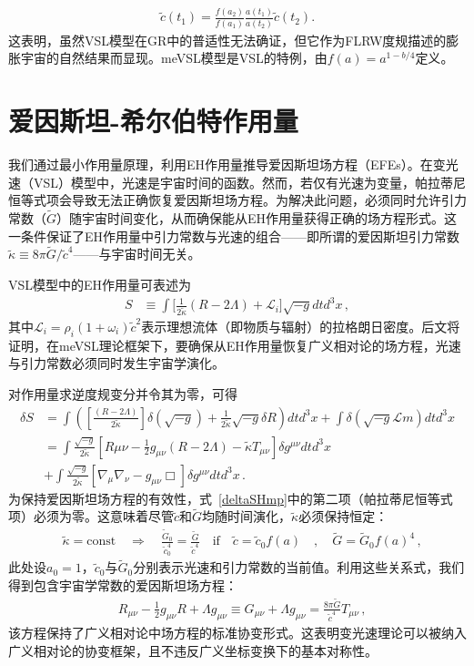 \documentclass[jkps,preprint,fleqn]{revtex4}
\newcommand{\tc}{\tilde{c}}
\newcommand{\tG}{\tilde{G}}
\newcommand{\tkapp}{\tilde{\kappa}}
\begin{document}
\begin{CJK*}{UTF8}{gbsn}
\begin{align} \tc(t_1) = \frac{f(a_2)}{f(a_1)} \frac{a(t_1)}{a(t_2)} \tc(t_2) \label{cVSL}. \end{align}这表明，虽然VSL模型在GR中的普适性无法确证，但它作为FLRW度规描述的膨胀宇宙的自然结果而显现。meVSL模型是VSL的特例，由$f(a) = a^{1-b/4}$定义\cite{Lee:2020zts,Lee:2023bjz}。
\section{爱因斯坦-希尔伯特作用量}\label{sec:HEaction}

我们通过最小作用量原理，利用EH作用量推导爱因斯坦场方程（EFEs）。在变光速（VSL）模型中，光速是宇宙时间的函数。然而，若仅有光速为变量，帕拉蒂尼恒等式项会导致无法正确恢复爱因斯坦场方程。为解决此问题，必须同时允许引力常数（$\tG$）随宇宙时间变化，从而确保能从EH作用量获得正确的场方程形式\cite{Lee:2020zts}。这一条件保证了EH作用量中引力常数与光速的组合——即所谓的爱因斯坦引力常数$\tkapp \equiv 8 \pi \tG/\tc^4$——与宇宙时间无关。

VSL模型中的EH作用量可表述为
\begin{align} S &\equiv \int \Biggl[ \frac{1}{2 \tkapp} \left( R - 2 \Lambda \right) + \mathcal{L}_i \Biggr] \sqrt{-g} dt d^3x \label{SHmp} \,, \end{align}
其中$\mathcal{L}_i = \rho_i (1 + \omega_i) \tc^2$表示理想流体（即物质与辐射）的拉格朗日密度。后文将证明，在meVSL理论框架下，要确保从EH作用量恢复广义相对论的场方程，光速与引力常数必须同时发生宇宙学演化。

对作用量求逆度规变分并令其为零，可得
\begin{align} \delta S &= \int \left( \left[ \frac{\left( R - 2 \Lambda \right)}{2 \tkapp} \right] \delta \left( \sqrt{-g} \right)  + \frac{1}{2\tkapp} \sqrt{-g} \delta R \right) dt d^3 x + \int \delta \left( \sqrt{-g} \mathcal{L}{m} \right) dt d^3 x \nonumber \\ &= \int \frac{\sqrt{-g}}{2 \tkapp} \left[ R{\mu\nu} - \frac{1}{2} g_{\mu\nu} \left( R - 2 \Lambda \right) - \tkapp T_{\mu\nu} \right] \delta g^{\mu\nu} dtd^3 x \nonumber \\ &+ \int \frac{\sqrt{-g}}{2 \tkapp} \left[ \nabla_{\mu} \nabla_{\nu} - g_{\mu\nu} \Box \right] \delta g^{\mu\nu} dtd^3 x \label{deltaSHmp} \,. \end{align}
为保持爱因斯坦场方程的有效性，式~\eqref{deltaSHmp}中的第二项（帕拉蒂尼恒等式项）必须为零。这意味着尽管$\tc$和$\tG$均随时间演化，$\tkapp$必须保持恒定：
\begin{align}
&\tkapp = \text{const} \quad \Rightarrow \quad \frac{\tG_0}{\tc_0^4} = \frac{\tG}{\tc^4} \quad \textrm{if} \quad \tc = \tc_0 f(a) \quad , \quad \tG = \tG_{0} f(a)^4 \label{tkappaconstmp} \,,
\end{align}
此处设$a_0 = 1$，$\tc_0$与$\tG_0$分别表示光速和引力常数的当前值。利用这些关系式，我们得到包含宇宙学常数的爱因斯坦场方程：
\begin{align} &R_{\mu\nu} - \frac{1}{2} g_{\mu\nu} R + \Lambda g_{\mu\nu} \equiv G_{\mu\nu} + \Lambda g_{\mu\nu}  = \frac{8 \pi \tG}{\tc^4} T_{\mu\nu} \label{tEFEmp} \,, \end{align}
该方程保持了广义相对论中场方程的标准协变形式。这表明变光速理论可以被纳入广义相对论的协变框架，且不违反广义坐标变换下的基本对称性。

\end{CJK*}
\end{document}
